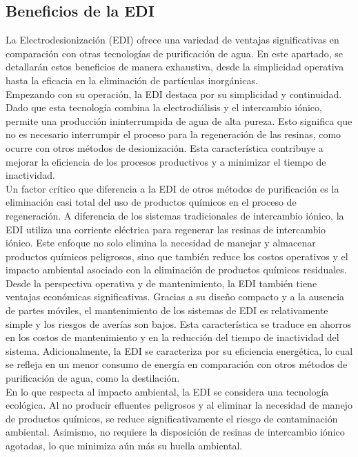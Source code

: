 \subsection{Beneficios de la EDI}
La Electrodesionización (EDI) ofrece una variedad de ventajas significativas en comparación con otras tecnologías de
purificación de agua. En este apartado, se detallarán estos beneficios de manera exhaustiva, desde la simplicidad operativa
hasta la eficacia en la eliminación de partículas inorgánicas.\\

Empezando con su operación, la EDI destaca por su simplicidad y continuidad. Dado que esta tecnología combina la electrodiálisis
y el intercambio iónico, permite una producción ininterrumpida de agua de alta pureza. Esto significa que no es necesario
interrumpir el proceso para la regeneración de las resinas, como ocurre con otros métodos de desionización. Esta característica
contribuye a mejorar la eficiencia de los procesos productivos y a minimizar el tiempo de inactividad.\\

Un factor crítico que diferencia a la EDI de otros métodos de purificación es la eliminación casi total del uso de productos
químicos en el proceso de regeneración. A diferencia de los sistemas tradicionales de intercambio iónico, la EDI utiliza una
corriente eléctrica para regenerar las resinas de intercambio iónico. Este enfoque no solo elimina la necesidad de manejar
y almacenar productos químicos peligrosos, sino que también reduce los costos operativos y el impacto ambiental asociado con
la eliminación de productos químicos residuales.\\

Desde la perspectiva operativa y de mantenimiento, la EDI también tiene ventajas económicas significativas. Gracias a su
diseño compacto y a la ausencia de partes móviles, el mantenimiento de los sistemas de EDI es relativamente simple y los
riesgos de averías son bajos. Esta característica se traduce en ahorros en los costos de mantenimiento y en la reducción
del tiempo de inactividad del sistema. Adicionalmente, la EDI se caracteriza por su eficiencia energética, lo cual se refleja
en un menor consumo de energía en comparación con otros métodos de purificación de agua, como la destilación.\\

En lo que respecta al impacto ambiental, la EDI se considera una tecnología ecológica. Al no producir efluentes peligrosos y
al eliminar la necesidad de manejo de productos químicos, se reduce significativamente el riesgo de contaminación ambiental.
Asimismo, no requiere la disposición de resinas de intercambio iónico agotadas, lo que minimiza aún más su huella ambiental.\\

